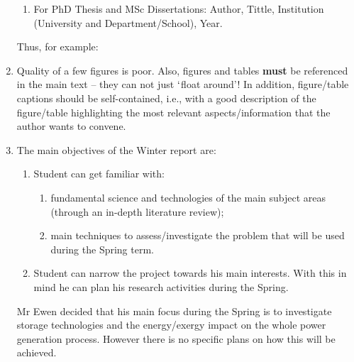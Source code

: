 \documentclass[14pt,twoside]{report}
\begin{document}
\begin{enumerate}
\begin{enumerate}
\item For PhD Thesis and MSc Dissertations: Author, Tittle, Institution (University and Department/School), Year.
\end{enumerate}  
Thus, for example:
%
\item Quality of a few figures is poor. Also, figures and tables {\bf must} be referenced in the main text -- they can not just $\lq$float around'! In addition, figure/table captions should be self-contained, i.e., with a good description of the figure/table highlighting the most relevant aspects/information that the author wants to convene. 
% 
\item The main objectives of the Winter report are:
\begin{enumerate} 
\item Student can get familiar with:    
\begin{enumerate}
\item fundamental science and technologies of the main subject areas (through an in-depth literature review);
\item main techniques to assess/investigate the problem that will be used during the Spring term.
\end{enumerate}
\item Student can narrow the project towards his main interests. With this in mind he can plan his research activities during the Spring.
\end{enumerate}
Mr Ewen decided that his main focus during the Spring is to investigate storage technologies and the energy/exergy impact on the whole power generation process. However there is no specific plans on how this will be achieved.
% 
\end{enumerate}
\end{document}
